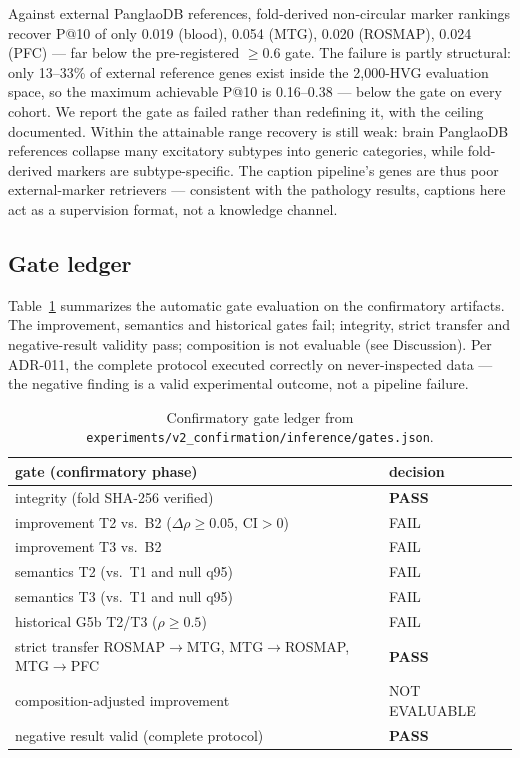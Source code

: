 \documentclass[11pt]{article}
\begin{document}
Against external PanglaoDB references, fold-derived non-circular marker
rankings recover P@10 of only 0.019 (blood), 0.054 (MTG), 0.020
(ROSMAP), 0.024 (PFC) --- far below the pre-registered $\geq0.6$ gate.
The failure is partly structural: only 13--33\% of external reference
genes exist inside the 2{,}000-HVG evaluation space, so the maximum
achievable P@10 is 0.16--0.38 --- below the gate on every cohort. We
report the gate as failed rather than redefining it, with the ceiling
documented. Within the attainable range recovery is still weak: brain
PanglaoDB references collapse many excitatory subtypes into generic
categories, while fold-derived markers are subtype-specific. The
caption pipeline's genes are thus poor external-marker retrievers ---
consistent with the pathology results, captions here act as a
supervision format, not a knowledge channel.

\subsection{Gate ledger}
\label{sec:gates}

Table~\ref{tab:gates} summarizes the automatic gate evaluation on the
confirmatory artifacts. The improvement, semantics and historical
gates fail; integrity, strict transfer and negative-result validity
pass; composition is not evaluable (see Discussion). Per ADR-011, the
complete protocol executed correctly on never-inspected data --- the
negative finding is a valid experimental outcome, not a pipeline
failure.

\begin{table}[t]
\centering\small
\begin{tabular}{@{}ll@{}}
\toprule
gate (confirmatory phase) & decision \\
\midrule
integrity (fold SHA-256 verified) & \textbf{PASS} \\
improvement T2 vs.\ B2 ($\Delta\rho\geq0.05$, CI$>0$) & FAIL \\
improvement T3 vs.\ B2 & FAIL \\
semantics T2 (vs.\ T1 and null q95) & FAIL \\
semantics T3 (vs.\ T1 and null q95) & FAIL \\
historical G5b T2/T3 ($\rho\geq0.5$) & FAIL \\
strict transfer ROSMAP$\to$MTG, MTG$\to$ROSMAP, MTG$\to$PFC & \textbf{PASS} \\
composition-adjusted improvement & NOT EVALUABLE \\
negative result valid (complete protocol) & \textbf{PASS} \\
\bottomrule
\end{tabular}
\caption{Confirmatory gate ledger from
\texttt{experiments/v2\_confirmation/inference/gates.json}.}
\label{tab:gates}
\end{table}
\end{document}
